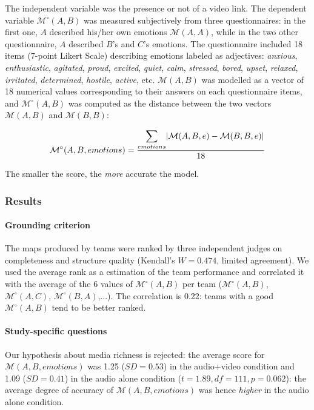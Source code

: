\documentclass[natbib]{svjour3}
\newcommand{\M}[3]{{\mathcal{M}(#1, #2, #3)}}
\newcommand{\model}[3]{{$\mathcal{M}(#1, #2, #3)$}}
\newcommand{\gmodel}[2]{{$\mathcal{M}(#1, #2)$}}
\newcommand{\gModel}[2]{{$\mathcal{M}^{\circ}(#1, #2)$}}
\newcommand{\Mdeg}[3]{{\mathcal{M}^{\circ}(#1, #2, #3)}}
\DeclarePairedDelimiter\abs{\lvert}{\rvert}%
\begin{document}
The independent variable was the presence or not of a video link. The dependent
variable \gModel{A}{B} was measured subjectively from three questionnaires: in
the first one, $A$ described his/her own emotions \gmodel{A}{A}, while in the
two other questionnaire, $A$ described $B$'s and $C$'s emotions. The questionnaire
included 18 items (7-point Likert Scale) describing emotions labeled as
adjectives: \emph{anxious}, \emph{enthusiastic}, \emph{agitated}, \emph{proud},
\emph{excited}, \emph{quiet}, \emph{calm}, \emph{stressed}, \emph{bored},
\emph{upset}, \emph{relaxed}, \emph{irritated}, \emph{determined},
\emph{hostile}, \emph{active}, etc. \gmodel{A}{B} was modelled as a vector of 18
numerical values corresponding to their answers on each questionnaire items, and
\gModel{A}{B} was computed as the distance between the two vectors
\gmodel{A}{B} and \gmodel{B}{B}:

\[
    \Mdeg{A}{B}{emotions} = \frac{\displaystyle\sum_{emotions} \abs{\M{A}{B}{e} -
    \M{B}{B}{e}}}{18}
\]

The smaller the score, the \emph{more} accurate the model.

\subsubsection*{Results}

\paragraph{Grounding criterion} The maps produced by teams were ranked by three
independent judges on completeness and structure quality (Kendall's $W=0.474$,
limited agreement). We used the average rank as a estimation of the team
performance and correlated it with the average of the 6 values of \gModel{A}{B}
per team (\gModel{A}{B}, \gModel{A}{C}, \gModel{B}{A},...). The correlation is
0.22: teams with a good \gModel{A}{B} tend to be better ranked. 

\paragraph{Study-specific questions} Our hypothesis about media richness is
rejected: the average score for \model{A}{B}{emotions} was 1.25 ($SD = 0.53$) in
the audio+video condition and 1.09 ($SD = 0.41$) in the audio alone condition
($t=1.89, df=111, p = 0.062$): the average degree of accuracy of
\model{A}{B}{emotions} was hence \emph{higher} in the audio alone condition.
\end{document}
